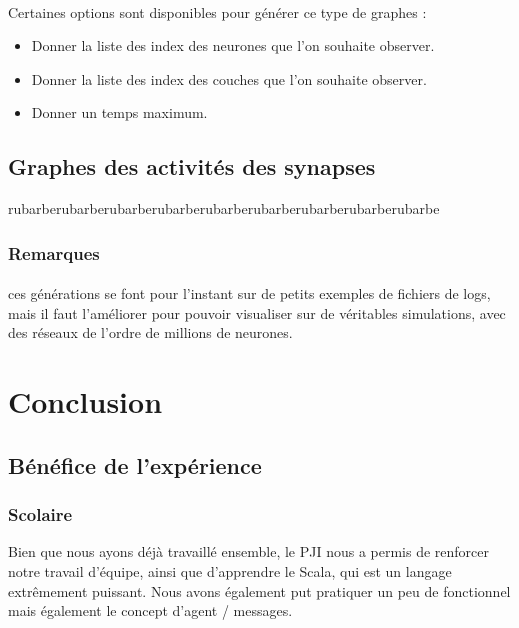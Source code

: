 \documentclass[a4paper,10pt]{article}
\begin{document}
\paragraph{}
Certaines options sont disponibles pour générer ce type de graphes :
\begin{itemize}
\item{Donner la liste des index des neurones que l’on souhaite observer.}
\item{Donner la liste des index des couches que l’on souhaite observer.}
\item{Donner un temps maximum.}
\end{itemize}

\subsection{Graphes des activités des synapses}

rubarberubarberubarberubarberubarberubarberubarberubarberubarbe

\subsubsection*{Remarques}
\paragraph{}
ces générations se font pour l’instant sur de petits exemples de fichiers de logs, mais il faut l’améliorer pour pouvoir visualiser sur de véritables simulations, avec des réseaux de l’ordre de millions de neurones.

\newpage

\section*{Conclusion}

\subsection*{Bénéfice de l'expérience}
\subsubsection*{Scolaire}
Bien que nous ayons déjà travaillé ensemble, le PJI nous a permis de renforcer notre travail d'équipe, ainsi que d'apprendre  le Scala, qui est un langage extrêmement puissant. Nous avons également put pratiquer un peu de fonctionnel mais également le concept d'agent / messages.
\end{document}

